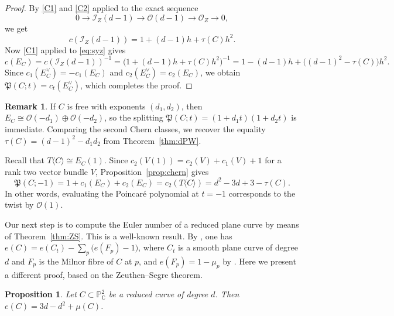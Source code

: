 \documentclass[11pt]{amsart}
\newtheorem{proposition}[theorem]{Proposition}
\theoremstyle{definition}
\newtheorem{remark}[theorem]{Remark}
\numberwithin{equation}{section}
\newcommand{\PP}{\mathbb{P}}
\newcommand{\CC}{\mathbb{C}}
\newcommand{\cO}{\mathcal{O}}
\newcommand{\cI}{\mathcal{I}}
\newcommand{\Pfrak}{\mathfrak{P}}
\begin{document}
\begin{proof}
By \ref{C1} and \ref{C2} applied to the exact sequence 
$$0\to\cI_Z(d-1)\to\cO(d-1)\to\cO_Z\to 0,$$
we get 
$$c(\cI_Z(d-1))=1+(d-1)h+\tau(C)h^2 .$$
Now \ref{C1} applied to \eqref{eq:syz} gives
\[
c(E_C)=c(\cI_Z(d-1))^{-1}=\bigl(1+(d-1)h+\tau(C)h^2\bigr)^{-1}=1-(d-1)h+\bigl((d-1)^2-\tau(C)\bigr)h^2 .
\]
Since $c_1(E_C^\vee)=-c_1(E_C)$ and $c_2(E_C^\vee)=c_2(E_C)$, we obtain $\Pfrak(C;t)=c_t(E_C^\vee)$, which completes the proof.
\end{proof}

\begin{remark}\label{rem:split}
If $C$ is free with exponents $(d_1,d_2)$, then $E_C\cong\cO(-d_1)\oplus\cO(-d_2)$, so the splitting $\Pfrak(C;t)=(1+d_1t)(1+d_2t)$ is immediate.
Comparing the second Chern classes, we recover the equality $\tau(C)=(d-1)^2-d_1d_2$ from Theorem~\ref{thm:dPW}.
\end{remark}

Recall that $T\langle C\rangle\cong E_C(1)$.
Since $c_2(V(1))=c_2(V)+c_1(V)+1$ for a rank two vector bundle $V$, Proposition~\ref{prop:chern} gives
\begin{equation}\label{eq:twist}
\Pfrak(C;-1)=1+c_1(E_C)+c_2(E_C)=c_2(T\langle C\rangle)=d^2-3d+3-\tau(C).
\end{equation}
In other words, evaluating the Poincar\'e polynomial at $t=-1$ corresponds to the twist by $\cO(1)$.

Our next step is to compute the Euler number of a reduced plane curve by means of
Theorem~\ref{thm:ZS}. This is a well-known result. By \cite[Section~9.2, Lemma~1 and the
proof of Theorem~5]{BK}, one has $e(C)=e(C_t)-\sum_{p}\bigl(e(F_p)-1\bigr)$, where $C_t$ is
a smooth plane curve of degree $d$ and $F_p$ is the Milnor fibre of $C$ at $p$, and
$e(F_p)=1-\mu_p$ by \cite[Section~8.5]{BK}. Here we present a different proof, based on the
Zeuthen--Segre theorem.

\begin{proposition}\label{prop:eC}
Let $C\subset\PP^2_\CC$ be a reduced curve of degree $d$. Then $e(C)=3d-d^2+\mu(C)$.
\end{proposition}
\end{document}

